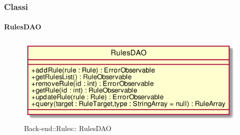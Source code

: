 \subsubsection{Classi}
\hypertarget{ RulesDAO_label}{\paragraph{ RulesDAO}}
\begin{figure}[h]
	\centering
	\includegraphics[width=\textwidth,height=\textheight,keepaspectratio]{images/Class_RulesDAO.png}
	\caption{Back-end::Rules:: RulesDAO}
\end{figure}
